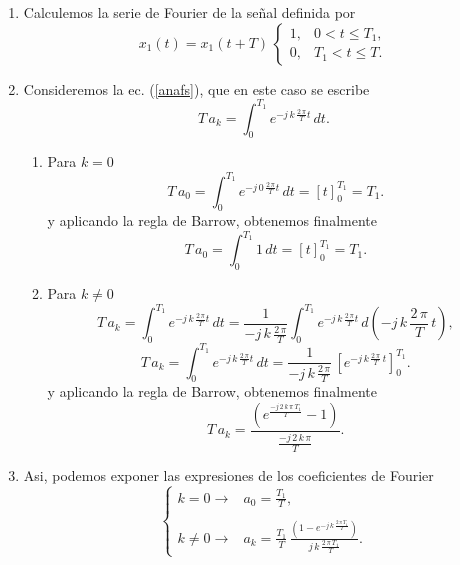\begin{enumerate}

\item  Calculemos la serie de Fourier de la se\~{n}al definida por 
\begin{equation}
x_{1}\left( t\right) = x_{1}(t+T) \, \left\{ 
\begin{array}{cc}
1, & 0 < t \leq T_{1}, \\ 
0, & T_{1} < t\leq T.
\end{array}
\right.
\end{equation}

\item Consideremos la ec. (\ref{anafs}), que en este caso se escribe
\begin{equation}
T \, a_{k} = \int_{0}^{T_{1}}e^{-j \, k \, \frac{2 \, \pi }{T}t} \, dt.
\end{equation}

\begin{enumerate}
\item Para $k = 0$
\begin{equation}
T \, a_{0}=\int_{0}^{T_{1}}e^{-j \, 0 \, \frac{2 \, \pi }{T}t} \, dt = \left[ t \right]_{0}^{T_{1}} = T_{1}. 
\end{equation}
y aplicando la regla de Barrow, obtenemos finalmente
\begin{equation}
T \, a_{0}=\int_{0}^{T_{1}} 1 \, dt = \left[ t \right]_{0}^{T_{1}} = T_{1}. 
\end{equation}

\item Para $k \neq 0$
\begin{equation}
T \, a_{k}=\int_{0}^{T_{1}}e^{-j \, k \, \frac{2 \, \pi }{T}t} \, dt =
\frac{1}{-j \, k \, \frac{2 \, \pi }{T}} \int_{0}^{T_{1}} e^{-j \, k \, \frac{2 \, \pi }{T}t} \, d(-j \, k \, \frac{2 \, \pi }{T} \, t),
\end{equation}
\begin{equation}
T \, a_{k}=\int_{0}^{T_{1}}e^{-j \, k \, \frac{2 \, \pi }{T}t} \, dt =
\frac{1}{-j \, k \, \frac{2 \, \pi}{T}} \, 
\left[ e^{-j \, k \, \frac{2 \, \pi}{T} \, t} \right]_{0}^{T_{1}}.
\end{equation}
y aplicando la regla de Barrow, obtenemos finalmente
\begin{equation}
T \, a_{k} =
\frac{\left(e^{\frac{-j \, 2 \, k \, \pi \, T_{1}}{T}} - 1\right)}{\frac{- j \, 2 \, k \, \pi}{T}}.
\end{equation}
\end{enumerate}

\item Asi, podemos exponer las expresiones de los coeficientes de Fourier
\begin{equation}
\left\{
\begin{array}{ll}
k=0 \rightarrow & a_{0} = \frac{T_{1}}{T}, \\ 
\\
k \neq 0 \rightarrow & a_{k}= 
\frac{T_{1}}{T} \, \frac{\left(1 - e^{-j \, k \, \frac{2 \, \pi \, T_{1}}{T}}\right)}{j \, k \, \frac{2 \, \pi \, T_{1}}{T}}.
\end{array}
\right.
\end{equation}
\end{enumerate}

